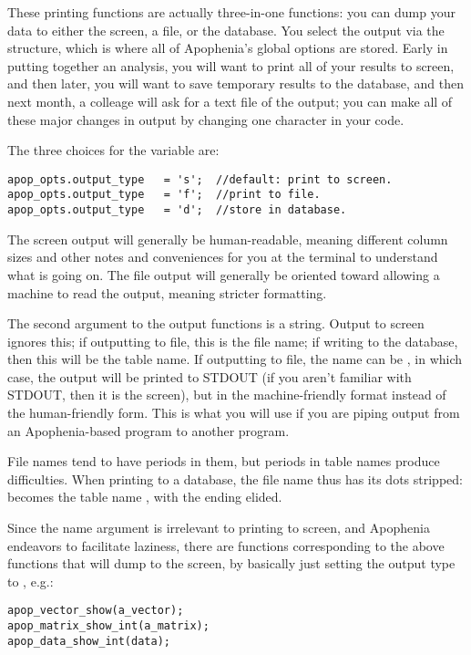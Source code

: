 These printing functions are actually three-in-one functions: you can
dump your data to either the screen, a file, or the database. You select
the output via the  structure, which is where all of
Apophenia's global options are stored. Early in putting together an
analysis, you will want to print all of your results to screen, and then
later, you will want to save temporary results to the database, and then
next month, a colleage will ask for a text file of the output; you can
make all of these major changes in output by changing 
one character in your code.

The three choices for the  
variable are:
\begin{lstlisting}
apop_opts.output_type   = 's';  //default: print to screen.
apop_opts.output_type   = 'f';  //print to file.
apop_opts.output_type   = 'd';  //store in database.
\end{lstlisting}

The screen output will generally be human-readable, meaning different
column sizes and other notes and conveniences for you at the terminal to
understand what is going on. The file output will generally be oriented
toward allowing a machine to read the output, meaning stricter formatting.

The second argument to the output functions is a string.  Output to
screen ignores this; if outputting to file, this is the file name;
if writing to the database, then this will be the table name.
If outputting to file, the name can be , in which case, the
output will be printed to STDOUT (if you aren't familiar with STDOUT,
then it is the screen), but in the machine-friendly format instead of
the human-friendly form. This is what you will use if you are piping
output from an Apophenia-based program to another program.

File names tend to have periods in them, but periods in table names
produce difficulties.  When printing to a database, the file name thus
has its dots stripped:  becomes the table name
, with the ending elided.

Since the name argument is irrelevant to printing to screen, and
Apophenia endeavors to facilitate laziness, there are functions
corresponding to the above  functions that will
dump to the screen, by basically just setting the output type to , e.g.:
 
 
 
 
\begin{lstlisting}
apop_vector_show(a_vector);
apop_matrix_show_int(a_matrix);
apop_data_show_int(data);
\end{lstlisting}

